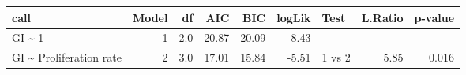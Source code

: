 \begin{table}[ht]
\centering
\begin{tabular}{lrrrrrlrr}
  \hline
call & Model & df & AIC & BIC & logLik & Test & L.Ratio & p-value \\ 
  \hline
GI \~{} 1 &  1 & 2.0 & 20.87 & 20.09 & -8.43 &  &  &  \\ 
  GI \~{} Proliferation rate &  2 & 3.0 & 17.01 & 15.84 & -5.51 & 1 vs 2 & 5.85 & 0.016 \\ 
   \hline
\end{tabular}
\end{table}
